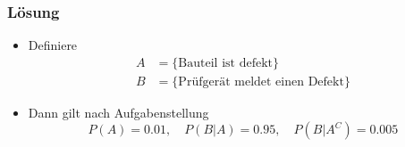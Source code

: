 
\begin{frame}
\frametitle{Lösung}
\begin{itemize}[<+->]
\item Definiere 
\begin{align*}
A &= \lbrace \text{Bauteil ist defekt}\rbrace \\
B &= \lbrace \text{Prüfgerät meldet einen Defekt}\rbrace
\end{align*}
\item Dann gilt nach Aufgabenstellung
\[ P(A) = 0.01, \quad P(B|A) = 0.95, \quad P(B|A^C) = 0.005\]
\end{itemize}
\end{frame}

